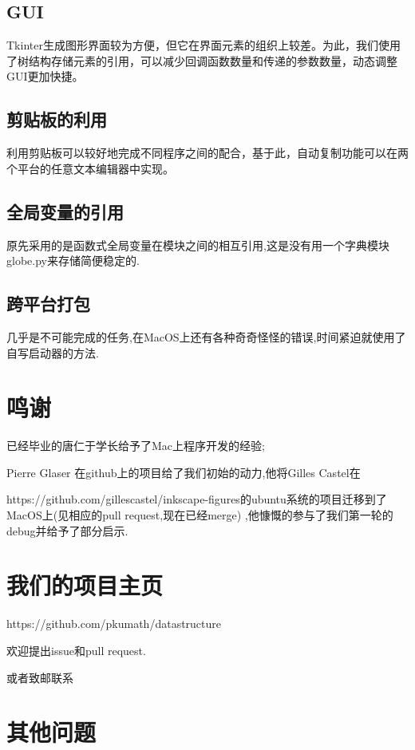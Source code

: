 \documentclass[AutoFakeBold,letterpaper,12pt,hidelinks]{article}
\begin{document}
\subsection{GUI}

Tkinter生成图形界面较为方便，但它在界面元素的组织上较差。为此，我们使用了树结构存储元素的引用，可以减少回调函数数量和传递的参数数量，动态调整GUI更加快捷。

\subsection{剪贴板的利用}

利用剪贴板可以较好地完成不同程序之间的配合，基于此，自动复制功能可以在两个平台的任意文本编辑器中实现。

\subsection{全局变量的引用}%

原先采用的是函数式全局变量在模块之间的相互引用,这是没有用一个字典模块globe.py来存储简便稳定的.

\subsection{跨平台打包}%

几乎是不可能完成的任务,在MacOS上还有各种奇奇怪怪的错误,时间紧迫就使用了自写启动器的方法.

\section{鸣谢}%

已经毕业的唐仁于学长给予了Mac上程序开发的经验;

Pierre Glaser 在github上的项目给了我们初始的动力,他将Gilles Castel在

https://github.com/gillescastel/inkscape-figures的ubuntu系统的项目迁移到了 MacOS上(见相应的pull request,现在已经merge) ,他慷慨的参与了我们第一轮的debug并给予了部分启示.

\section{我们的项目主页}%

https://github.com/pkumath/datastructure

欢迎提出issue和pull request.

或者致邮联系

\section{其他问题}%
\end{document}
